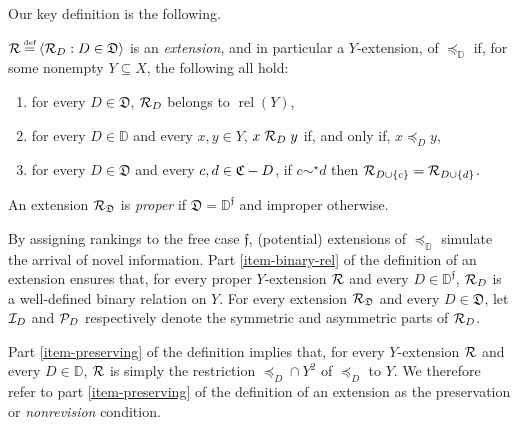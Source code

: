 \documentclass[12pt,a4paper,twoside]{article}
\newcommand{\relations}{\operatorname{rel}}
\newcommand{\novel}{\mathfrak f}
\newcommand{\preceqb}{\mathbin{\preceq}}
\newcommand{\ext}{\mathrel{\mc R}}
\newcommand{\sext}{\mathrel{\mc P}}
\newcommand{\next}{\mathrel{\mc I}}
\newcommand{\extb}{\mathbin{\mc R}}
\newcommand{\mbbd}{{\mathds D}}
\newcommand{\mbbdp}{{\mathds D^{\novel}}}
\newcommand{\mbbdpp}{{\mathfrak D}}
\newcommand{\mbbcpp}{{\mathfrak C}}
\begin{document}
Our key definition is the following. 

\begin{definition}\label{def-extension}
  $\extb \defeq \langle \extb_{D}: D\in \mbbdpp \rangle $ 
  is an \emph{extension}, and in particular a $Y$-extension, of $ \preceq_{\mbbd}$ if, for some nonempty
  $ Y \subseteq X $, the following all hold$:$

\begin{enumerate}%

\item\label{item-binary-rel} for every $ D\in \mbbdpp $, $\ext_{D} $ belongs
  to $ \relations (Y)$,

\item \label{item-preserving} for every $ D \in \mbbd$ and every $x,y\in Y$,
  $x \ext_{D} y $ if, and only if, $x \preceq_{D} y$,

\item \label{item-dimension} for every $D\in \mbbdpp$ and %
every $c,d \in \mbbcpp\bs D$,  if $ c \sim ^ \star d $ then
  $ \extb _ { D \cup \{c\} } = \extb _ { D \cup \{d\}}$.
\end{enumerate}
An extension $\ext_{\mbbdpp}$ is  \emph{proper} if $\mbbdpp = \mbbdp$ and
improper otherwise.
\end{definition}
By assigning rankings to the free case $\novel$, (potential) extensions of
$\preceq_{\mbbd}$ simulate the arrival of novel information.  Part
\ref{item-binary-rel} of the definition of an extension ensures that, for every
proper $Y$-extension $\ext$ and every $D\in \mbbdp$, $\ext_{D}$ is a
well-defined binary relation on $Y$. For every extension $\ext_{\mbbdpp}$ and
every $D \in \mbbdpp$, let $ \next_{D}$ and $ \sext_{D}$ respectively denote the
symmetric and asymmetric parts of $\ext_{D}$.

Part \ref{item-preserving} of the definition implies that, for every
$Y$-extension $\ext$ and every $D\in \mbbd$, $ \ext$ is simply the restriction
$\preceqb_{D}\cap Y^{2} $ of $\preceq_{D}$ to $Y$.  We therefore refer to part
\ref{item-preserving} of the definition of an extension as the preservation or
\emph{nonrevision} condition.
\end{document}
